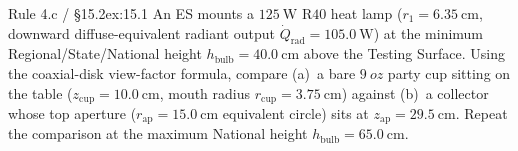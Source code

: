 \begin{workedexample}{Rule 4.c / §15.2}{ex:15.1}
An ES mounts a $\SI{125}{\watt}$ $\mathrm{R40}$ heat lamp ($r_1 = \SI{6.35}{\centi\meter}$, downward diffuse-equivalent radiant output $\dot{Q}_{\mathrm{rad}} = \SI{105.0}{\watt}$) at the minimum Regional/State/National height $h_{\mathrm{bulb}} = \SI{40.0}{\centi\meter}$ above the Testing Surface. Using the coaxial-disk view-factor formula, compare (a)~a bare $\SI{9}{oz}$ party cup sitting on the table ($z_{\mathrm{cup}} = \SI{10.0}{\centi\meter}$, mouth radius $r_{\mathrm{cup}} = \SI{3.75}{\centi\meter}$) against (b)~a collector whose top aperture ($r_{\mathrm{ap}} = \SI{15.0}{\centi\meter}$ equivalent circle) sits at $z_{\mathrm{ap}} = \SI{29.5}{\centi\meter}$. Repeat the comparison at the maximum National height $h_{\mathrm{bulb}} = \SI{65.0}{\centi\meter}$.


\end{workedexample}
